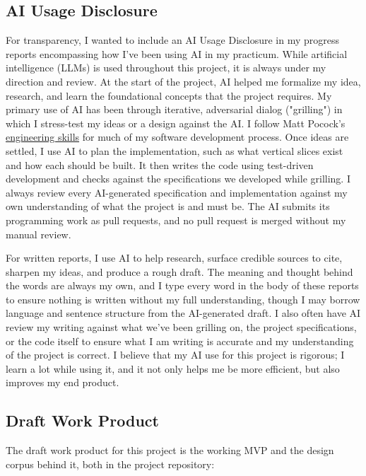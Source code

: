 \documentclass[12pt]{article}
\begin{document}
\subsection*{AI Usage Disclosure}

For transparency, I wanted to include an AI Usage Disclosure in my progress reports encompassing how I've been using AI in my practicum. While artificial intelligence (LLMs) is used throughout this project, it is always under my direction and review. At the start of the project, AI helped me formalize my idea, research, and learn the foundational concepts that the project requires. My primary use of AI has been through iterative, adversarial dialog ("grilling") in which I stress-test my ideas or a design against the AI. I follow Matt Pocock's \href{https://github.com/mattpocock/skills\#engineering}{engineering skills} for much of my software development process. Once ideas are settled, I use AI to plan the implementation, such as what vertical slices exist and how each should be built. It then writes the code using test-driven development and checks against the specifications we developed while grilling. I always review every AI-generated specification and implementation against my own understanding of what the project is and must be. The AI submits its programming work as pull requests, and no pull request is merged without my manual review.

For written reports, I use AI to help research, surface credible sources to cite, sharpen my ideas, and produce a rough draft. The meaning and thought behind the words are always my own, and I type every word in the body of these reports to ensure nothing is written without my full understanding, though I may borrow language and sentence structure from the AI-generated draft. I also often have AI review my writing against what we've been grilling on, the project specifications, or the code itself to ensure what I am writing is accurate and my understanding of the project is correct. I believe that my AI use for this project is rigorous; I learn a lot while using it, and it not only helps me be more efficient, but also improves my end product.

\subsection*{Draft Work Product}

The draft work product for this project is the working MVP and the design corpus behind it, both in the project repository:
\end{document}
